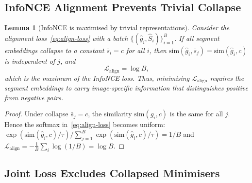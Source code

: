 \documentclass[12pt]{article}
\newtheorem{lemma}{Lemma}
\begin{document}
\subsection{InfoNCE Alignment Prevents Trivial Collapse}

\begin{lemma}[InfoNCE is maximised by trivial representations]
\label{lem:align-collapse}
Consider the alignment loss~\eqref{eq:align-loss} with
a batch $\{(\hat{g}_i, \hat{S}_i)\}_{i=1}^{B}$.
If all segment embeddings collapse to a constant
$\bar{s}_i = c$ for all $i$, then
$\mathrm{sim}(\hat{g}_i, \bar{s}_j) = \mathrm{sim}(\hat{g}_i, c)$
is independent of $j$, and
\begin{equation}
    \mathcal{L}_{\mathrm{align}} = \log B,
\end{equation}
which is the maximum of the InfoNCE loss.
Thus, minimising $\mathcal{L}_{\mathrm{align}}$ requires the
segment embeddings to carry image-specific information that
distinguishes positive from negative pairs.
\end{lemma}

\begin{proof}
Under collapse $\bar{s}_j = c$, the similarity
$\mathrm{sim}(\hat{g}_i, c)$ is the same for all $j$.
Hence the softmax in~\eqref{eq:align-loss} becomes uniform:
$\exp(\mathrm{sim}(\hat{g}_i, c)/\tau) / \sum_{j=1}^{B}\exp(\mathrm{sim}(\hat{g}_i, c)/\tau) = 1/B$
and $\mathcal{L}_{\mathrm{align}} = -\frac{1}{B}\sum_i \log(1/B) = \log B$.
\end{proof}

\subsection{Joint Loss Excludes Collapsed Minimisers}
\end{document}
